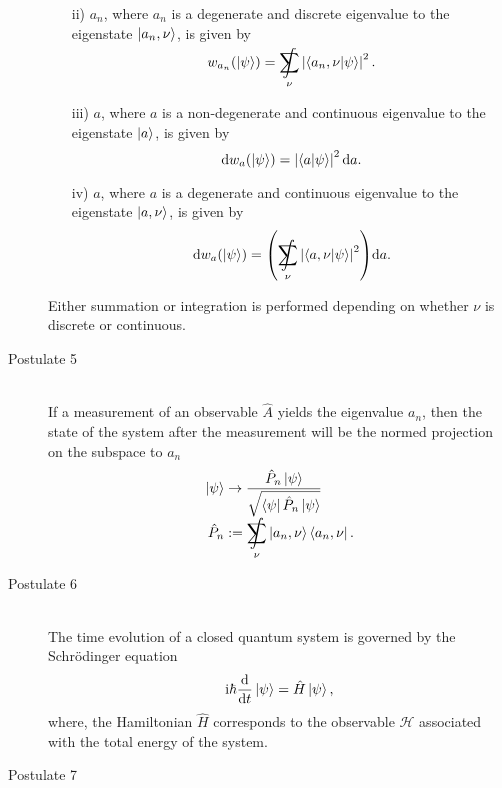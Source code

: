 \begin{description}
\begin{itemize}
					\item[ii)] $a_n$, where $a_n$ is a degenerate and discrete eigenvalue to the eigenstate $\Ket{a_n,\nu}$, is given by
						\begin{equation}
							w_{a_n}(\Ket{\psi}) = \SumInt_\nu \left|\braket{a_n ,\nu|\psi}\right|^2.
						\end{equation}
					\item[iii)] $a$, where $a$ is a non-degenerate and continuous eigenvalue to the eigenstate $\Ket{a}$, is given by
						\begin{equation}
							\dd w_a(\Ket{\psi}) = \left| \braket{a|\psi} \right|^2 \dd a.
						\end{equation}
					\item[iv)] $a$, where $a$ is a degenerate and continuous eigenvalue to the eigenstate $\Ket{a, \nu}$, is given by
						\begin{equation}
							\dd w_a(\Ket{\psi}) = \qty( \SumInt_\nu \abs{\braket{a,\nu |\psi} }^2 ) \dd a.
						\end{equation}
				\end{itemize}
				Either summation or integration is performed depending on whether $\nu$ is discrete or continuous.
			\item[Postulate 5]\hfill \\
				If a measurement of an observable $\hat{A}$ yields the eigenvalue $a_n$, then the state of the system after the measurement will be the normed projection on the subspace to $a_n$
				\begin{equation}
					\begin{aligned}
						\Ket{\psi} & \to \frac{\hat{P}_n\Ket{\psi}} {\sqrt{\Bra{\psi}\hat{P}_n\Ket{\psi}}} \\
						\hat{P}_n &:= \SumInt_\nu \Ket{a_n,\nu}\Bra{a_n,\nu}. \\
					\end{aligned}
				\end{equation}
			\item[Postulate 6]\hfill \\
				The time evolution of a closed quantum system is governed by the Schrödinger equation
				\begin{equation}
					\mathrm{i}\hbar\dv{t}\Ket{\psi} = \hat{H}\Ket{\psi},
				\end{equation}
				where, the Hamiltonian $\hat{H}$ corresponds to the observable $\mathcal{H}$ associated with the total energy of the system.
			\item[Postulate 7]\hfill \\

\end{description}
